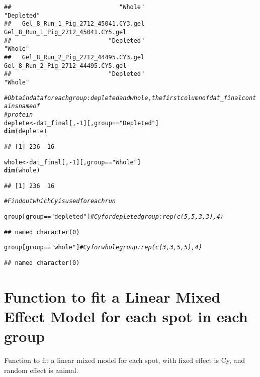 \documentclass{article}\usepackage[]{graphicx}\usepackage[]{color}
\makeatletter
\newcommand{\hlnum}[1]{\textcolor[rgb]{0.686,0.059,0.569}{#1}}%
\newcommand{\hlstr}[1]{\textcolor[rgb]{0.192,0.494,0.8}{#1}}%
\newcommand{\hlcom}[1]{\textcolor[rgb]{0.678,0.584,0.686}{\textit{#1}}}%
\newcommand{\hlopt}[1]{\textcolor[rgb]{0,0,0}{#1}}%
\newcommand{\hlstd}[1]{\textcolor[rgb]{0.345,0.345,0.345}{#1}}%
\newcommand{\hlkwb}[1]{\textcolor[rgb]{0.69,0.353,0.396}{#1}}%
\newcommand{\hlkwd}[1]{\textcolor[rgb]{0.737,0.353,0.396}{\textbf{#1}}}%
\newenvironment{kframe}{%
 \def\at@end@of@kframe{}%
 \ifinner\ifhmode%
  \def\at@end@of@kframe{\end{minipage}}%
  \begin{minipage}{\columnwidth}%
 \fi\fi%
 \def\FrameCommand##1{\hskip\@totalleftmargin \hskip-\fboxsep
 \colorbox{shadecolor}{##1}\hskip-\fboxsep
     \hskip-\linewidth \hskip-\@totalleftmargin \hskip\columnwidth}%
 \MakeFramed {\advance\hsize-\width
   \@totalleftmargin\z@ \linewidth\hsize
   \@setminipage}}%
 {\par\unskip\endMakeFramed%
 \at@end@of@kframe}
\newenvironment{knitrout}{}{} %
\makeatother
\begin{document}
\begin{knitrout}
\begin{kframe}
\begin{verbatim}
##                              "Whole"                           "Depleted" 
##   Gel_8_Run_1_Pig_2712_45041.CY3.gel   Gel_8_Run_1_Pig_2712_45041.CY5.gel 
##                           "Depleted"                              "Whole" 
##   Gel_8_Run_2_Pig_2712_44495.CY3.gel   Gel_8_Run_2_Pig_2712_44495.CY5.gel 
##                           "Depleted"                              "Whole"
\end{verbatim}
\begin{alltt}
\hlcom{# Obtain data for each group: depleted and whole, the first column of dat_final contains name of}
\hlcom{# protein}
\hlstd{deplete} \hlkwb{<-} \hlstd{dat_final[,} \hlopt{-}\hlnum{1}\hlstd{][, group} \hlopt{==} \hlstr{"Depleted"}\hlstd{]}
\hlkwd{dim}\hlstd{(deplete)}
\end{alltt}
\begin{verbatim}
## [1] 236  16
\end{verbatim}
\begin{alltt}
\hlstd{whole} \hlkwb{<-} \hlstd{dat_final[,} \hlopt{-}\hlnum{1}\hlstd{][, group} \hlopt{==} \hlstr{"Whole"}\hlstd{]}
\hlkwd{dim}\hlstd{(whole)}
\end{alltt}
\begin{verbatim}
## [1] 236  16
\end{verbatim}
\end{kframe}
\end{knitrout}


\begin{knitrout}
\color{fgcolor}\begin{kframe}
\begin{alltt}
\hlcom{# Find out which Cy is used for each run}

\hlstd{group[group} \hlopt{==} \hlstr{"depleted"}\hlstd{]}  \hlcom{# Cy for depleted group: rep(c(5,5,3,3),4)}
\end{alltt}
\begin{verbatim}
## named character(0)
\end{verbatim}
\begin{alltt}
\hlstd{group[group} \hlopt{==} \hlstr{"whole"}\hlstd{]}  \hlcom{# Cy for whole group: rep(c(3,3,5,5),4)}
\end{alltt}
\begin{verbatim}
## named character(0)
\end{verbatim}
\end{kframe}
\end{knitrout}

\section{Function to fit a Linear Mixed Effect Model for each spot in each group}
Function to fit a linear mixed model for each spot, with fixed effect is Cy, and random effect is animal.
\end{document}
